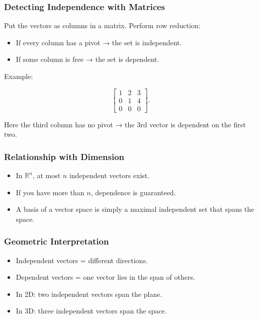 \documentclass[
  letterpaper,
  DIV=11,
  numbers=noendperiod]{scrreprt}
\providecommand{\tightlist}{%
  \setlength{\itemsep}{0pt}\setlength{\parskip}{0pt}}
\begin{document}
\subsubsection{Detecting Independence with
Matrices}\label{detecting-independence-with-matrices}

Put the vectors as columns in a matrix. Perform row reduction:

\begin{itemize}
\tightlist
\item
  If every column has a pivot → the set is independent.
\item
  If some column is free → the set is dependent.
\end{itemize}

Example:

\[
\begin{bmatrix}  
1 & 2 & 3 \\  
0 & 1 & 4 \\  
0 & 0 & 0  
\end{bmatrix}.
\]

Here the third column has no pivot → the 3rd vector is dependent on the
first two.

\subsubsection{Relationship with
Dimension}\label{relationship-with-dimension}

\begin{itemize}
\tightlist
\item
  In \(\mathbb{R}^n\), at most \(n\) independent vectors exist.
\item
  If you have more than \(n\), dependence is guaranteed.
\item
  A basis of a vector space is simply a maximal independent set that
  spans the space.
\end{itemize}

\subsubsection{Geometric
Interpretation}\label{geometric-interpretation-4}

\begin{itemize}
\tightlist
\item
  Independent vectors = different directions.
\item
  Dependent vectors = one vector lies in the span of others.
\item
  In 2D: two independent vectors span the plane.
\item
  In 3D: three independent vectors span the space.
\end{itemize}
\end{document}
